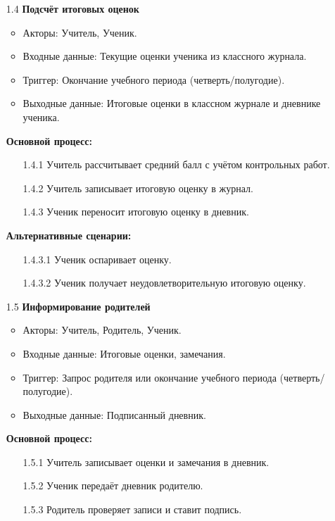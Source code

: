 \documentclass[a4paper, final]{article}
\begin{document}
\begin{enumerate}
  \item[1.4] \textbf{Подсчёт итоговых оценок}
  \begin{itemize}
    \item Акторы: Учитель, Ученик.
    \item Входные данные: Текущие оценки ученика из классного журнала.
    \item Триггер: Окончание учебного периода (четверть/полугодие).
    \item Выходные данные: Итоговые оценки в классном журнале и дневнике ученика.
  \end{itemize}

  \textbf{Основной процесс:}
  \begin{enumerate}
    \item[1.4.1] Учитель рассчитывает средний балл с учётом контрольных работ.
    \item[1.4.2] Учитель записывает итоговую оценку в журнал.
    \item[1.4.3] Ученик переносит итоговую оценку в дневник.
  \end{enumerate}

  \textbf{Альтернативные сценарии:}
  \begin{itemize}
    \item[1.4.3.1] Ученик оспаривает оценку.
    \item[1.4.3.2] Ученик получает неудовлетворительную итоговую оценку. 
  \end{itemize}

  \item[1.5] \textbf{Информирование родителей}
  \begin{itemize}
    \item Акторы: Учитель, Родитель, Ученик.
    \item Входные данные: Итоговые оценки, замечания.
    \item Триггер: Запрос родителя или окончание учебного периода (четверть/полугодие).
    \item Выходные данные: Подписанный дневник.
  \end{itemize}

  \textbf{Основной процесс:}
  \begin{enumerate}
    \item[1.5.1] Учитель записывает оценки и замечания в дневник.
    \item[1.5.2] Ученик передаёт дневник родителю.
    \item[1.5.3] Родитель проверяет записи и ставит подпись.
  \end{enumerate}


\end{enumerate}
\end{document}
